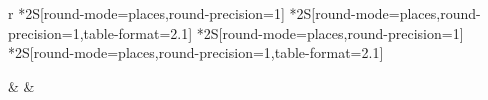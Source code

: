 
\addtolength{\tabcolsep}{-3pt}
\begingroup
\begin{tabular}{
  r
  *{2}{S[round-mode=places,round-precision=1]}
  *{2}{S[round-mode=places,round-precision=1,table-format=2.1]}
  *{2}{S[round-mode=places,round-precision=1]}
  *{2}{S[round-mode=places,round-precision=1,table-format=2.1]}
  }

  \toprule
  &   &  \\
  \cmidrule(r){2-5} \cmidrule(r){6-9}



\end{tabular}
